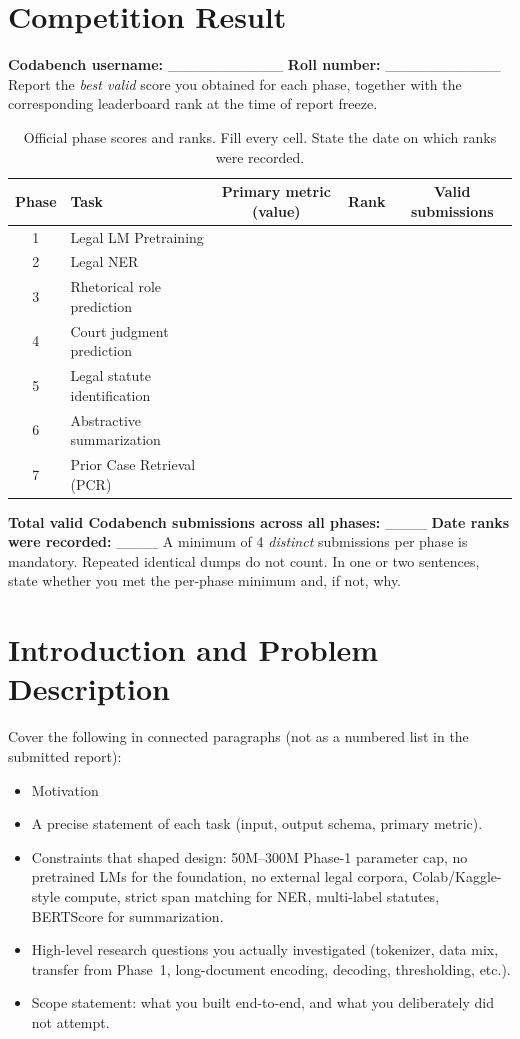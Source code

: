 \documentclass[11pt, oneside]{article}
\begin{document}
\section{Competition Result}
\noindent
\textbf{Codabench username:} \_\_\_\_\_\_\_\_\_\_\_
\hfill
\textbf{Roll number:} \_\_\_\_\_\_\_\_\_\_\_
\medskip
\noindent
Report the \emph{best valid} score you obtained for each phase, together with the corresponding leaderboard rank at the time of report freeze. 
\begin{table}[H]
\centering
\caption{Official phase scores and ranks. Fill every cell. State the date on which ranks were recorded.}
\label{tab:leaderboard}
\begin{tabular}{clccc}
\toprule
Phase & Task & Primary metric (value) & Rank & Valid submissions \\
\midrule
1 & Legal LM Pretraining &  &  &  \\
2 & Legal NER &  &  &  \\
3 & Rhetorical role prediction &  &  &  \\
4 & Court judgment prediction &  &  &  \\
5 & Legal statute identification &  &  &  \\
6 & Abstractive summarization &  &  &  \\
7 & Prior Case Retrieval (PCR) &  &  &  \\
\bottomrule
\end{tabular}
\end{table}
\noindent
\textbf{Total valid Codabench submissions across all phases:} \_\_\_\_
\quad
\textbf{Date ranks were recorded:} \_\_\_\_
\medskip
A minimum of 4 \emph{distinct} submissions per phase is mandatory. Repeated identical dumps do not count. In one or two sentences, state whether you met the per-phase minimum and, if not, why.
\section{Introduction and Problem Description}
Cover the following in connected paragraphs (not as a numbered list in the submitted report):
\begin{itemize}[leftmargin=*]
    \item Motivation
    \item A precise statement of each task (input, output schema, primary metric).
    \item Constraints that shaped design: 50M--300M Phase-1 parameter cap, no pretrained LMs for the foundation, no external legal corpora, Colab/Kaggle-style compute, strict span matching for NER, multi-label statutes, BERTScore for summarization.
    \item High-level research questions you actually investigated (tokenizer, data mix, transfer from Phase~1, long-document encoding, decoding, thresholding, etc.).
    \item Scope statement: what you built end-to-end, and what you deliberately did not attempt.
\end{itemize}
\end{document}
